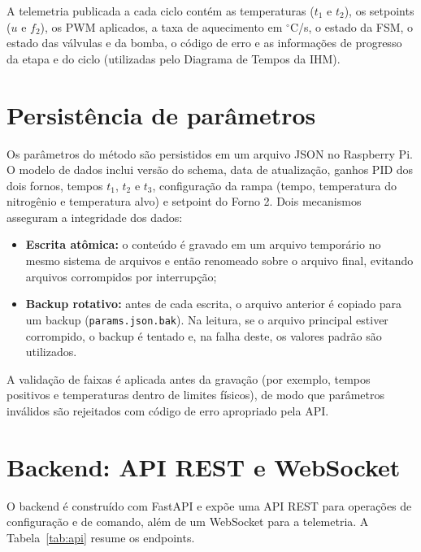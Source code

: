 A telemetria publicada a cada ciclo cont\'em as temperaturas ($t_1$ e $t_2$), os
setpoints ($u$ e $f_2$), os PWM aplicados, a taxa de aquecimento em $^{\circ}$C/s,
o estado da FSM, o estado das v\'alvulas e da bomba, o c\'odigo de erro e as
informa\c{c}\~oes de progresso da etapa e do ciclo (utilizadas pelo Diagrama de
Tempos da IHM).

\section{Persist\^encia de par\^ametros}

Os par\^ametros do m\'etodo s\~ao persistidos em um arquivo JSON no Raspberry Pi.
O modelo de dados inclui vers\~ao do schema, data de atualiza\c{c}\~ao, ganhos
PID dos dois fornos, tempos $t_1$, $t_2$ e $t_3$, configura\c{c}\~ao da rampa
(tempo, temperatura do nitrog\^enio e temperatura alvo) e setpoint do Forno 2.
Dois mecanismos asseguram a integridade dos dados:

\begin{itemize}
  \item \textbf{Escrita at\^omica:} o conte\'udo \'e gravado em um arquivo
  tempor\'ario no mesmo sistema de arquivos e ent\~ao renomeado sobre o arquivo
  final, evitando arquivos corrompidos por interrup\c{c}\~ao;
  \item \textbf{Backup rotativo:} antes de cada escrita, o arquivo anterior \'e
  copiado para um backup (\texttt{params.json.bak}). Na leitura, se o arquivo
  principal estiver corrompido, o backup \'e tentado e, na falha deste, os
  valores padr\~ao s\~ao utilizados.
\end{itemize}

A valida\c{c}\~ao de faixas \'e aplicada antes da grava\c{c}\~ao (por exemplo,
tempos positivos e temperaturas dentro de limites f\'isicos), de modo que
par\^ametros inv\'alidos s\~ao rejeitados com c\'odigo de erro apropriado pela
API.

\section{Backend: API REST e WebSocket}

O backend \'e constru\'ido com FastAPI \cite{fastapi} e exp\~oe uma API REST para
opera\c{c}\~oes de configura\c{c}\~ao e de comando, al\'em de um WebSocket para a
telemetria. A Tabela~\ref{tab:api} resume os endpoints.

